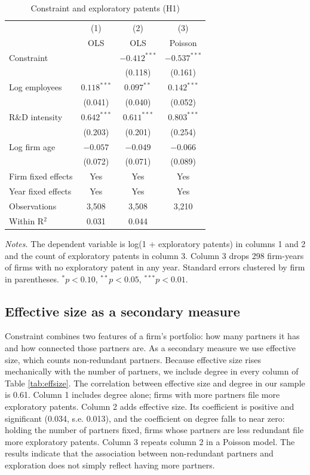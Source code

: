 \documentclass[12pt]{article}
\begin{document}
\begin{table}[!htbp]
\centering
\begin{threeparttable}
\caption{Constraint and exploratory patents (H1)}
\label{tab:h1}
\small
\begin{tabular}{lccc}
\toprule
 & (1) & (2) & (3) \\
 & OLS & OLS & Poisson \\
\midrule
Constraint & & $-0.412^{***}$ & $-0.537^{***}$ \\
 & & (0.118) & (0.161) \\
Log employees & $0.118^{***}$ & $0.097^{**}$ & $0.142^{***}$ \\
 & (0.041) & (0.040) & (0.052) \\
R\&D intensity & $0.642^{***}$ & $0.611^{***}$ & $0.803^{***}$ \\
 & (0.203) & (0.201) & (0.254) \\
Log firm age & $-0.057$ & $-0.049$ & $-0.066$ \\
 & (0.072) & (0.071) & (0.089) \\
\midrule
Firm fixed effects & Yes & Yes & Yes \\
Year fixed effects & Yes & Yes & Yes \\
Observations & 3,508 & 3,508 & 3,210 \\
Within R$^2$ & 0.031 & 0.044 & \\
\bottomrule
\end{tabular}
\begin{tablenotes}
\footnotesize
\item \textit{Notes.} The dependent variable is log(1 + exploratory patents) in columns 1 and 2 and the count of exploratory patents in column 3. Column 3 drops 298 firm-years of firms with no exploratory patent in any year. Standard errors clustered by firm in parentheses. $^{*}p<0.10$, $^{**}p<0.05$, $^{***}p<0.01$.
\end{tablenotes}
\end{threeparttable}
\end{table}

\subsection{Effective size as a secondary measure}

Constraint combines two features of a firm's portfolio: how many partners it has and how connected those partners are. As a secondary measure we use effective size, which counts non-redundant partners. Because effective size rises mechanically with the number of partners, we include degree in every column of Table \ref{tab:effsize}. The correlation between effective size and degree in our sample is 0.61. Column 1 includes degree alone; firms with more partners file more exploratory patents. Column 2 adds effective size. Its coefficient is positive and significant (0.034, s.e. 0.013), and the coefficient on degree falls to near zero: holding the number of partners fixed, firms whose partners are less redundant file more exploratory patents. Column 3 repeats column 2 in a Poisson model. The results indicate that the association between non-redundant partners and exploration does not simply reflect having more partners.
\end{document}
